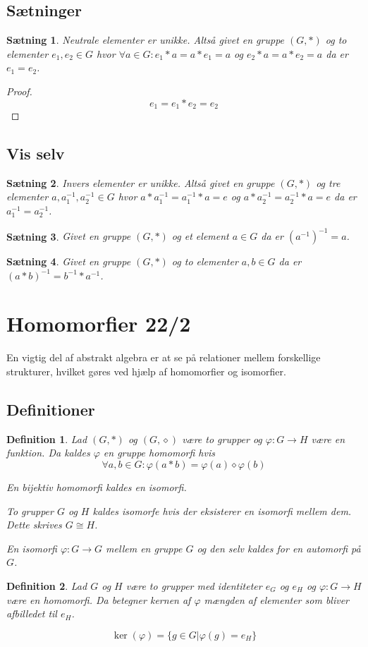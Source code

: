 \documentclass{article}
\newcommand{\inv}{^{-1}}
\newcommand{\too}{\rightarrow}
\newtheorem{setn}{Sætning}
\newtheorem{defi}{Definition}
\begin{document}
		\subsection*{Sætninger}
		\begin{setn}
			Neutrale elementer er unikke. Altså givet en gruppe $(G,*)$ og to elementer
			$e_1, e_2 \in G$ hvor $\forall a \in G: e_1*a=a*e_1=a$ og $e_2*a=a*e_2=a$
			da er $e_1 = e_2$.
		\end{setn}
		\begin{proof}
			$$e_1 = e_1*e_2 = e_2$$
		\end{proof}
		\subsection*{Vis selv}
		\begin{setn}
			Invers elementer er unikke. Altså givet en gruppe $(G,*)$ og tre elementer
			$a,a_1\inv,a_2\inv\in G$ hvor $a*a_1\inv=a_1\inv*a=e$ og $a*a_2\inv=a_2\inv*a=e$
			da er $a_1\inv = a_2\inv$.
		\end{setn}
		\begin{setn}
			Givet en gruppe $(G,*)$ og et element $a \in G$ da er $(a\inv)\inv = a$.
		\end{setn}
		\begin{setn}
			Givet en gruppe $(G,*)$ og to elementer $a,b \in G$ da er $(a*b)\inv=b\inv*a\inv$.
		\end{setn}
	\newpage
	\section*{Homomorfier 22/2}
		En vigtig del af abstrakt algebra er at se på relationer mellem
		forskellige strukturer, hvilket gøres ved hjælp af homomorfier og isomorfier.
		\subsection*{Definitioner}
		\begin{defi}
			Lad $(G,*)$ og $(G,\diamond)$ være to grupper og $\varphi: G \too H$ være
			en funktion. Da kaldes $\varphi$ en gruppe homomorfi hvis
			$$\forall a, b \in G: \varphi(a*b) = \varphi(a) \diamond \varphi(b)$$

			En bijektiv homomorfi kaldes en isomorfi.

			To grupper $G$ og $H$ kaldes isomorfe hvis der eksisterer en isomorfi
			mellem dem. Dette skrives $G \cong H$.

			En isomorfi $\varphi: G \too G$ mellem en gruppe $G$ og den selv kaldes for en
			automorfi på $G$.
		\end{defi}
		\begin{defi}
			Lad $G$ og $H$ være to grupper med identiteter $e_G$ og $e_H$
			og $\varphi: G \too H$ være en homomorfi.
			Da betegner kernen af $\varphi$ mængden af elementer som bliver
			afbilledet til $e_H$.

			$$\ker(\varphi) = \{g \in G | \varphi(g) = e_H\}$$
		\end{defi}
\end{document}
